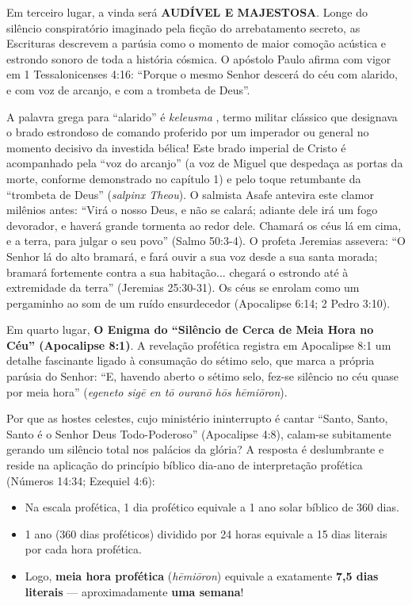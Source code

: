 Em terceiro lugar, a vinda será \textbf{AUDÍVEL E MAJESTOSA}.
Longe do silêncio conspiratório imaginado pela ficção do arrebatamento secreto, as Escrituras descrevem a parúsia como o momento de maior comoção acústica e estrondo sonoro de toda a história cósmica. O apóstolo Paulo afirma com vigor em 1 Tessalonicenses 4:16:
``Porque o mesmo Senhor descerá do céu com alarido, e com voz de arcanjo, e com a trombeta de Deus''.

A palavra grega para ``alarido'' é \textit{keleusma} , termo militar clássico que designava o brado estrondoso de comando proferido por um imperador ou general no momento decisivo da investida bélica! Este brado imperial de Cristo é acompanhado pela ``voz do arcanjo'' (a voz de Miguel que despedaça as portas da morte, conforme demonstrado no capítulo 1) e pelo toque retumbante da ``trombeta de Deus'' (\textit{salpinx Theou}).
O salmista Asafe antevira este clamor milênios antes: ``Virá o nosso Deus, e não se calará; adiante dele irá um fogo devorador, e haverá grande tormenta ao redor dele. Chamará os céus lá em cima, e a terra, para julgar o seu povo'' (Salmo 50:3-4). O profeta Jeremias assevera: ``O Senhor lá do alto bramará, e fará ouvir a sua voz desde a sua santa morada; bramará fortemente contra a sua habitação... chegará o estrondo até à extremidade da terra'' (Jeremias 25:30-31). Os céus se enrolam como um pergaminho ao som de um ruído ensurdecedor (Apocalipse 6:14; 2 Pedro 3:10).

Em quarto lugar, \textbf{O Enigma do ``Silêncio de Cerca de Meia Hora no Céu'' (Apocalipse 8:1)}.
A revelação profética registra em Apocalipse 8:1 um detalhe fascinante ligado à consumação do sétimo selo, que marca a própria parúsia do Senhor:
``E, havendo aberto o sétimo selo, fez-se silêncio no céu quase por meia hora'' (\textit{egeneto sigē en tō ouranō hōs hēmiōron}).

Por que as hostes celestes, cujo ministério ininterrupto é cantar ``Santo, Santo, Santo é o Senhor Deus Todo-Poderoso'' (Apocalipse 4:8), calam-se subitamente gerando um silêncio total nos palácios da glória?
A resposta é deslumbrante e reside na aplicação do princípio bíblico dia-ano de interpretação profética (Números 14:34; Ezequiel 4:6):
\begin{itemize}
  \item Na escala profética, 1 dia profético equivale a 1 ano solar bíblico de 360 dias.
  \item 1 ano (360 dias proféticos) dividido por 24 horas equivale a 15 dias literais por cada hora profética.
  \item Logo, \textbf{meia hora profética} (\textit{hēmiōron}) equivale a exatamente \textbf{7,5 dias literais} — aproximadamente \textbf{uma semana}!
\end{itemize}


